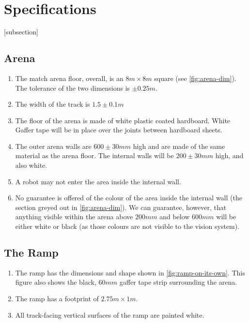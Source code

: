 \section{Specifications}
\label{sec:Specifications}

[subsection]
\newcommand{\rcnii}{\stepcounter{rulei}\arabic{section}.\arabic{subsection}.\arabic{rulei}}
\renewcommand{\labelenumi}{\rcnii}

\subsection{Arena}
\begin{enumerate}
\item The match arena floor, overall, is an $8m \times 8m$ square (see \autoref{fig:arena-dim}).
 The tolerance of the two dimensions is $\pm0.25m$.
\item The width of the track is $1.5\pm0.1m$
\item The floor of the arena is made of white plastic coated hardboard.
 White Gaffer tape will be in place over the joints between hardboard sheets.
\item The outer arena walls are $600\pm30mm$ high and are made of the same material as the arena floor.
 The internal walls will be $200\pm30mm$ high, and also white.
\item A robot may not enter the area inside the internal wall.
\item No guarantee is offered of the colour of the area inside the internal wall (the section greyed out in \autoref{fig:arena-dim}).
 We can guarantee, however, that anything visible within the arena above $200mm$ and below $600mm$ will be either white or black (as those colours are not visible to the vision system).
\end{enumerate}

\subsection{The Ramp}
\label{sub:Ramp}
\begin {enumerate}
\item The ramp has the dimensions and shape shown in \autoref{fig:ramp-on-its-own}.
 This figure also shows the black, $60mm$ gaffer tape strip surrounding the arena.
\item The ramp has a footprint of $2.75m \times 1m$.
\item All track-facing vertical surfaces of the ramp are painted white.
\end {enumerate}

